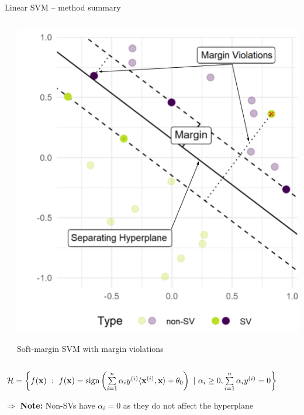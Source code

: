 \begin{vbframe}{Linear SVM -- method summary}
\begin{columns}[T]
\begin{column}{0.7\linewidth}
\medskip

\\

\end{column}
\begin{column}{0.3\linewidth}
    
  \includegraphics[width=\linewidth]{figure/svm_wording.png} \\
  \begin{center}
  \tiny{Soft-margin SVM with margin violations}
  \end{center}
\end{column}
\end{columns}



$\mathcal{H}  = \left \{f(\mathbf{x}) ~:~ f(\mathbf{x}) = \operatorname{sign} \left( \sum\limits_{i=1}^n \alpha_i y^{(i)} \langle \mathbf{x}^{(i)}, \mathbf{x} \rangle  + \theta_0 \right) ~|~ \alpha_i \geq 0,  \sum\limits_{i=1}^n \alpha_i y^{(i)} = 0 \right \}$

$\Rightarrow$ \textbf{Note:} Non-SVs have $\alpha_i = 0$ as they do not affect the hyperplane



\end{vbframe}
